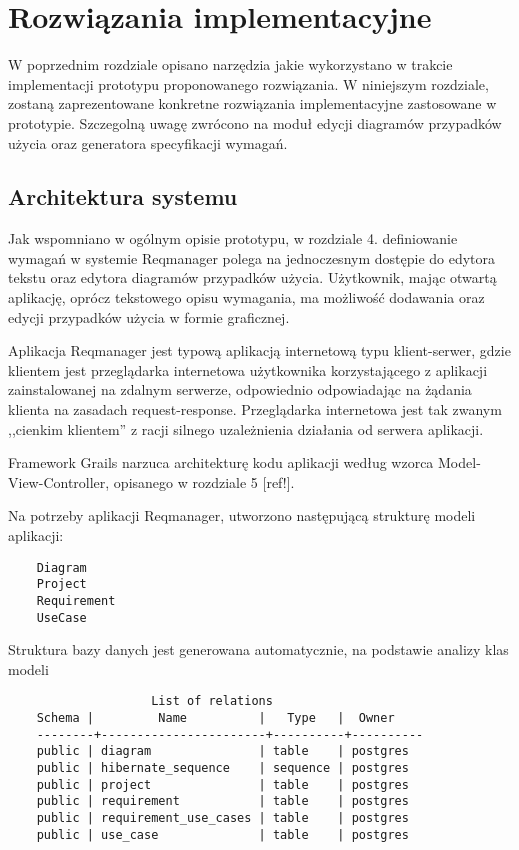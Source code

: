 \chapter{Rozwiązania implementacyjne}
  
  W poprzednim rozdziale opisano narzędzia jakie wykorzystano w trakcie implementacji prototypu proponowanego rozwiązania. W niniejszym rozdziale, zostaną zaprezentowane konkretne rozwiązania implementacyjne zastosowane w prototypie. Szczegolną uwagę zwrócono na moduł edycji diagramów przypadków użycia oraz generatora specyfikacji wymagań.

  \section{Architektura systemu}
    Jak wspomniano w ogólnym opisie prototypu, w rozdziale 4. definiowanie wymagań w systemie Reqmanager polega na jednoczesnym dostępie do edytora tekstu oraz edytora diagramów przypadków użycia. Użytkownik, mając otwartą aplikację, oprócz tekstowego opisu wymagania, ma możliwość dodawania oraz edycji przypadków użycia w formie graficznej.

    Aplikacja Reqmanager jest typową aplikacją internetową typu klient-serwer, gdzie klientem jest przeglądarka internetowa użytkownika korzystającego z aplikacji zainstalowanej na zdalnym serwerze, odpowiednio odpowiadając na żądania klienta na zasadach request-response. Przeglądarka internetowa jest tak zwanym ,,cienkim klientem'' z racji silnego uzależnienia działania od serwera aplikacji. 
    
    Framework Grails narzuca architekturę kodu aplikacji według wzorca Model-View-Controller, opisanego w rozdziale 5 [ref!].  

    Na potrzeby aplikacji Reqmanager, utworzono następującą strukturę modeli aplikacji:

    \begin{verbatim}
    Diagram 
    Project
    Requirement
    UseCase
    \end{verbatim}

    Struktura bazy danych jest generowana automatycznie, na podstawie analizy klas modeli 

    \begin{verbatim}
                    List of relations
    Schema |         Name          |   Type   |  Owner
    --------+-----------------------+----------+----------
    public | diagram               | table    | postgres
    public | hibernate_sequence    | sequence | postgres
    public | project               | table    | postgres
    public | requirement           | table    | postgres
    public | requirement_use_cases | table    | postgres
    public | use_case              | table    | postgres
    \end{verbatim}


